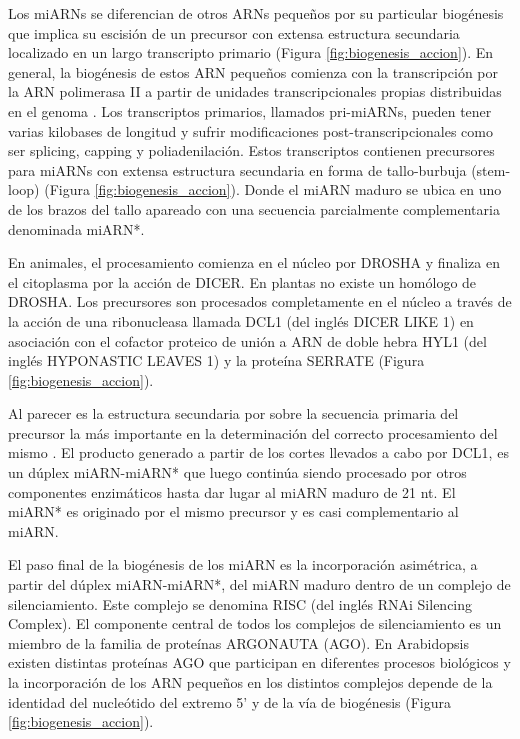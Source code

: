 Los miARNs se diferencian de otros ARNs pequeños por su particular biogénesis que implica su escisión de un precursor con extensa estructura secundaria localizado en un largo transcripto primario (Figura \ref{fig:biogenesis_accion}).
En general, la biogénesis de estos ARN pequeños comienza con la transcripción por la ARN polimerasa II \citep{Xie2005a} a partir de unidades transcripcionales propias distribuidas en el genoma \citep{Reinhart2002}.
Los transcriptos primarios, llamados pri-miARNs, pueden tener varias kilobases de longitud y sufrir modificaciones post-transcripcionales como ser splicing, capping y poliadenilación. 
Estos transcriptos contienen precursores para miARNs con extensa estructura secundaria en forma de tallo-burbuja (stem-loop) \citep{Jones-Rhoades2006} (Figura \ref{fig:biogenesis_accion}).
Donde el miARN maduro se ubica en uno de los brazos del tallo apareado con una secuencia parcialmente complementaria denominada miARN*.

En animales, el procesamiento comienza en el núcleo por DROSHA y finaliza en el citoplasma por la acción de DICER.
En plantas no existe un homólogo de DROSHA.
Los precursores son procesados completamente en el núcleo a través de la acción de una ribonucleasa llamada DCL1 \citep{Reinhart2002,pmid12417148} (del inglés DICER LIKE 1) en asociación con el cofactor proteico de unión a ARN de doble hebra HYL1 \citep{Han2004} (del inglés HYPONASTIC LEAVES 1) y la proteína SERRATE \citep{Lobbes2006} (Figura \ref{fig:biogenesis_accion}).

Al parecer es la estructura secundaria por sobre la secuencia primaria del precursor la más importante en la determinación del correcto procesamiento del mismo \citep{Bologna11112012} .
El producto generado a partir de los cortes llevados a cabo por DCL1, es un dúplex miARN-miARN* que luego continúa siendo procesado por otros componentes enzimáticos hasta dar lugar al miARN maduro de 21 nt.
El miARN* es originado por el mismo precursor y es casi complementario al miARN.

El paso final de la biogénesis de los miARN es la incorporación asimétrica, a partir del dúplex miARN-miARN*, del miARN maduro dentro de un complejo de silenciamiento.
Este complejo se denomina RISC (del inglés RNAi Silencing Complex).
El componente central de todos los complejos de silenciamiento es un miembro de la familia de proteínas ARGONAUTA (AGO).
En Arabidopsis existen distintas proteínas AGO que participan en diferentes procesos biológicos \citep{Cellulaire2008} y la incorporación de los ARN pequeños en los distintos complejos depende de la identidad del nucleótido del extremo 5' y de la vía de biogénesis \citep{pmid18342361,Montgomery2008,Takeda2008} (Figura \ref{fig:biogenesis_accion}). 

